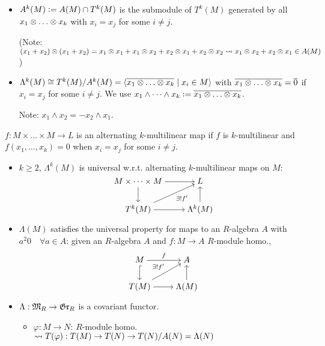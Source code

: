 \begin{itemize}
  \item $A^k(M) \vcentcolon= A(M) \cap T^k(M)$ is the submodule of $T^k(M)$
    generated by all $x_1 \Ot \dots \Ot x_k$ with $x_i = x_j$ for some $i\ne j$.

    (Note: $(x_1+x_2)\otimes(x_1+x_2) = x_1\otimes x_1 + x_1\otimes x_2 + x_2\otimes x_1 +
    x_2\otimes x_2 \leadsto x_1\otimes x_2 + x_2\otimes x_1 \in A(M)$)
  \item $\Lambda^k(M) \cong \quot{T^k(M)}{A^k(M)} = \gen{
    \ob{x_1\Ot \dots \Ot x_k} \mid x_i \in M
    }$ with $\ob{x_1\Ot \dots \Ot x_k} = \ob{0}$ if $x_i = x_j$ for some
    $i\ne j$. We use $x_1 \wedge \dots \wedge x_k \defeq
    \ob{x_1\Ot \dots \Ot x_k}$.

    Note: $x_1 \wedge x_2 = -x_2 \wedge x_1$.
\end{itemize}

\begin{definition}
  $f: M\times \dots \times M \to L$ is an alternating $k$-multilinear map if
  $f$ is $k$-multilinear and $f(x_1, \dots, x_k) = 0$ when $x_i = x_j$ for some
  $i \ne j$.
  \begin{itemize}
    \item $k \ge 2$, $\Lambda^k(M)$ is universal w.r.t. alternating
      $k$-multilinear maps on $M$:
      \[
        \begin{tikzcd}[cramped]
          M\times \dots \times M \arrow{r} \arrow{d} & L \\
          T^k(M) \arrow[swap]{ur}{\exists! f'}
          \arrow{r} & \Lambda^k(M) \arrow{u}
        \end{tikzcd}
      \]
    \item $\Lambda(M)$ satisfies the universal property for maps to an
      $R$-algebra $A$ with $a^2 0 \quad \forall a \in A$:
      given an $R$-algebra $A$ and $f:M \to A$ $R$-module homo.,
      \[
        \begin{tikzcd}[cramped]
          M \arrow{r}{f} \arrow[hook]{d} & A \\
          T(M) \arrow{ur}{\exists! f'}
          \arrow{r} & \Lambda(M) \arrow{u}
        \end{tikzcd}
      \]
    \item $\Lambda: \mathfrak{M}_R \to \mathfrak{Gr}_R$ is a covariant functor.
      \begin{itemize}
        \item $\varphi: M \to N$: $R$-module homo. $\leadsto
          T(\varphi): T(M) \to T(N) \to {T(N)}/{A(N)} = \Lambda(N)$
      \end{itemize}
  \end{itemize}
\end{definition}

